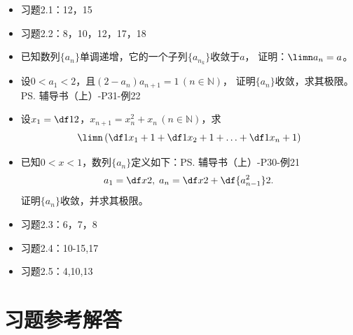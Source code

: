 \begin{itemize}
  \item 习题2.1：12，15
  \item 习题2.2：8，10，12，17，18
  \item 已知数列$\{a_n\}$单调递增，它的一个子列$\{a_{n_k}\}$收敛于$a$，
  证明：$\limn a_n=a$。
  \item 设$0<a_1<2$，且$(2-a_n)a_{n+1}=1\,(n\in\mathbb{N})$，
  	证明$\{a_n\}$收敛，求其极限。\ps{辅导书（上）-P31-例22}\\
  \item 设$x_1=\df 12$，$x_{n+1}=x_n^2+x_n\,(n\in\mathbb{N})$，求
	$$\limn\left(\df 1{x_1+1}+\df 1{x_2+1}+\ldots+\df
	1{x_n+1}\right)$$
  \item 已知$0<x<1$，数列$\{a_n\}$定义如下：\ps{辅导书（上）-P30-例21}
	$$a_1=\df x2,\;a_n=\df x2+\df{a_{n-1}^2}2.$$
	证明$\{a_n\}$收敛，并求其极限。
  \item 习题2.3：6，7，8
  \item 习题2.4：10-15,17
  \item 习题2.5：4,10,13
\end{itemize}
% 
\newpage

\section*{习题参考解答}

